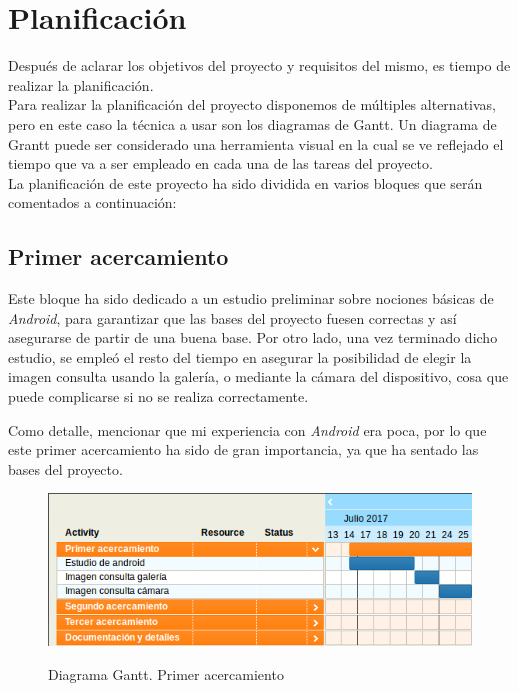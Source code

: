 \chapter{Planificación}

\label{cap:planificacion}


Después de aclarar los objetivos del proyecto y requisitos del mismo, es tiempo de realizar la planificación.\\

Para realizar la planificación del proyecto disponemos de múltiples alternativas, pero en este caso la técnica a usar son los diagramas de Gantt. Un diagrama de Grantt puede ser considerado una herramienta visual en la cual se ve reflejado el tiempo que va a ser empleado en cada una de las tareas del proyecto.\\

La planificación de este proyecto ha sido dividida en varios bloques que serán comentados a continuación:

\section{Primer acercamiento}

Este bloque ha sido dedicado a un estudio preliminar sobre nociones básicas de \textit{Android}, para garantizar que las bases del proyecto fuesen correctas y así asegurarse de partir de una buena base. Por otro lado, una vez terminado dicho estudio, se empleó el resto del tiempo en asegurar la posibilidad de elegir la imagen consulta usando la galería, o mediante la cámara del dispositivo, cosa que puede complicarse si no se realiza correctamente.

Como detalle, mencionar que mi experiencia con \textit{Android} era poca, por lo que este primer acercamiento ha sido de gran importancia, ya que ha sentado las bases del proyecto.

\begin{figure}[H] %
\centering
\includegraphics[scale=0.5]{imagenes/gant1.png}  %
\label{gant1.png}
\caption{Diagrama Gantt. Primer acercamiento}
\end{figure}

